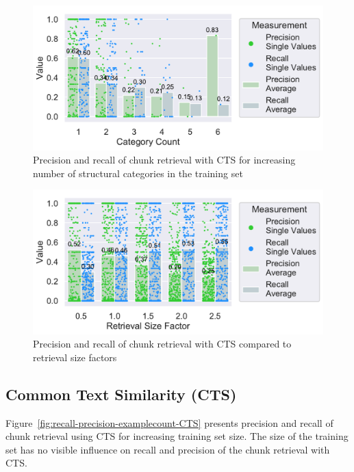 \documentclass[\myrootdir/main.tex]{subfiles}
\begin{document}
\begin{figure}[htbp]
		\centering
		\includegraphics[width=\textwidth, clip]{img/big-study/recall-precision-categorycount-CTS.pdf}
		\caption{Precision and recall of chunk retrieval with CTS for increasing number of structural categories in the training set}
		\label{fig:recall-precision-categorycount-CTS}
\end{figure}

\begin{figure}[htbp]
		\centering
		\includegraphics[width=\textwidth, clip]{img/big-study/contextsizefactor-precision-recall-CTS.pdf}
		\caption{Precision and recall of chunk retrieval with CTS compared to retrieval size factors}
		\label{fig:contextsizefactor-precision-recall-CTS}
\end{figure}

\subsection{Common Text Similarity (CTS)}
Figure~\ref{fig:recall-precision-examplecount-CTS} presents precision and recall of chunk retrieval using CTS for increasing training set size.
The size of the training set has no visible influence on recall and precision of the chunk retrieval with CTS\@.
\end{document}
